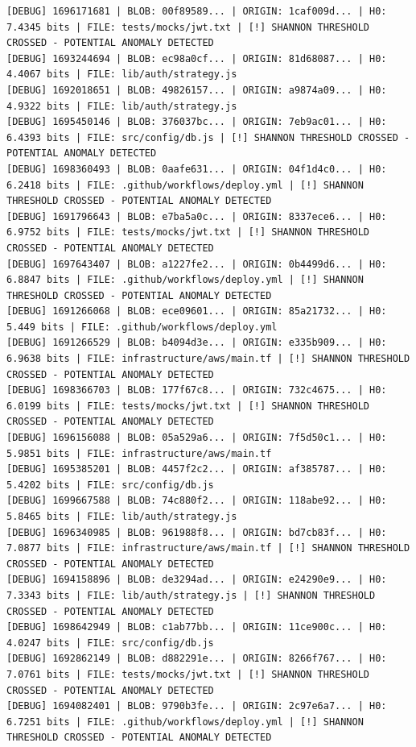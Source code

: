 \documentclass[12pt, a4paper, oneside]{report}
\begin{document}
\begin{lstlisting}[basicstyle=\tiny\ttfamily]
[DEBUG] 1696171681 | BLOB: 00f89589... | ORIGIN: 1caf009d... | H0: 7.4345 bits | FILE: tests/mocks/jwt.txt | [!] SHANNON THRESHOLD CROSSED - POTENTIAL ANOMALY DETECTED
[DEBUG] 1693244694 | BLOB: ec98a0cf... | ORIGIN: 81d68087... | H0: 4.4067 bits | FILE: lib/auth/strategy.js
[DEBUG] 1692018651 | BLOB: 49826157... | ORIGIN: a9874a09... | H0: 4.9322 bits | FILE: lib/auth/strategy.js
[DEBUG] 1695450146 | BLOB: 376037bc... | ORIGIN: 7eb9ac01... | H0: 6.4393 bits | FILE: src/config/db.js | [!] SHANNON THRESHOLD CROSSED - POTENTIAL ANOMALY DETECTED
[DEBUG] 1698360493 | BLOB: 0aafe631... | ORIGIN: 04f1d4c0... | H0: 6.2418 bits | FILE: .github/workflows/deploy.yml | [!] SHANNON THRESHOLD CROSSED - POTENTIAL ANOMALY DETECTED
[DEBUG] 1691796643 | BLOB: e7ba5a0c... | ORIGIN: 8337ece6... | H0: 6.9752 bits | FILE: tests/mocks/jwt.txt | [!] SHANNON THRESHOLD CROSSED - POTENTIAL ANOMALY DETECTED
[DEBUG] 1697643407 | BLOB: a1227fe2... | ORIGIN: 0b4499d6... | H0: 6.8847 bits | FILE: .github/workflows/deploy.yml | [!] SHANNON THRESHOLD CROSSED - POTENTIAL ANOMALY DETECTED
[DEBUG] 1691266068 | BLOB: ece09601... | ORIGIN: 85a21732... | H0: 5.449 bits | FILE: .github/workflows/deploy.yml
[DEBUG] 1691266529 | BLOB: b4094d3e... | ORIGIN: e335b909... | H0: 6.9638 bits | FILE: infrastructure/aws/main.tf | [!] SHANNON THRESHOLD CROSSED - POTENTIAL ANOMALY DETECTED
[DEBUG] 1698366703 | BLOB: 177f67c8... | ORIGIN: 732c4675... | H0: 6.0199 bits | FILE: tests/mocks/jwt.txt | [!] SHANNON THRESHOLD CROSSED - POTENTIAL ANOMALY DETECTED
[DEBUG] 1696156088 | BLOB: 05a529a6... | ORIGIN: 7f5d50c1... | H0: 5.9851 bits | FILE: infrastructure/aws/main.tf
[DEBUG] 1695385201 | BLOB: 4457f2c2... | ORIGIN: af385787... | H0: 5.4202 bits | FILE: src/config/db.js
[DEBUG] 1699667588 | BLOB: 74c880f2... | ORIGIN: 118abe92... | H0: 5.8465 bits | FILE: lib/auth/strategy.js
[DEBUG] 1696340985 | BLOB: 961988f8... | ORIGIN: bd7cb83f... | H0: 7.0877 bits | FILE: infrastructure/aws/main.tf | [!] SHANNON THRESHOLD CROSSED - POTENTIAL ANOMALY DETECTED
[DEBUG] 1694158896 | BLOB: de3294ad... | ORIGIN: e24290e9... | H0: 7.3343 bits | FILE: lib/auth/strategy.js | [!] SHANNON THRESHOLD CROSSED - POTENTIAL ANOMALY DETECTED
[DEBUG] 1698642949 | BLOB: c1ab77bb... | ORIGIN: 11ce900c... | H0: 4.0247 bits | FILE: src/config/db.js
[DEBUG] 1692862149 | BLOB: d882291e... | ORIGIN: 8266f767... | H0: 7.0761 bits | FILE: tests/mocks/jwt.txt | [!] SHANNON THRESHOLD CROSSED - POTENTIAL ANOMALY DETECTED
[DEBUG] 1694082401 | BLOB: 9790b3fe... | ORIGIN: 2c97e6a7... | H0: 6.7251 bits | FILE: .github/workflows/deploy.yml | [!] SHANNON THRESHOLD CROSSED - POTENTIAL ANOMALY DETECTED

\end{lstlisting}
\end{document}
